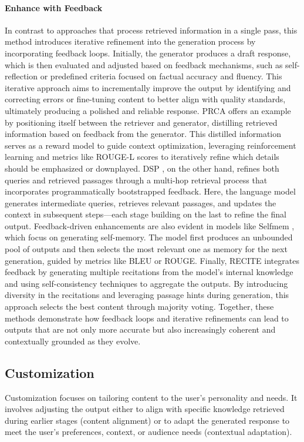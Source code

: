 \paragraph{Enhance with Feedback}
In contrast to approaches that process retrieved information in a single pass, this method introduces iterative refinement into the generation process by incorporating feedback loops. Initially, the generator produces a draft response, which is then evaluated and adjusted based on feedback mechanisms, such as self-reflection or predefined criteria focused on factual accuracy and fluency. This iterative approach aims to incrementally improve the output by identifying and correcting errors or fine-tuning content to better align with quality standards, ultimately producing a polished and reliable response. PRCA \cite{yang2023prca} offers an example by positioning itself between the retriever and generator, distilling retrieved information based on feedback from the generator. This distilled information serves as a reward model to guide context optimization, leveraging reinforcement learning and metrics like ROUGE-L scores to iteratively refine which details should be emphasized or downplayed. DSP \cite{khattab2022demonstratesearchpredict}, on the other hand, refines both queries and retrieved passages through a multi-hop retrieval process that incorporates programmatically bootstrapped feedback. Here, the language model generates intermediate queries, retrieves relevant passages, and updates the context in subsequent steps—each stage building on the last to refine the final output. Feedback-driven enhancements are also evident in models like Selfmem \cite{cheng2023lift}, which focus on generating self-memory. The model first produces an unbounded pool of outputs and then selects the most relevant one as memory for the next generation, guided by metrics like BLEU or ROUGE. Finally, RECITE \cite{shi2023replug} integrates feedback by generating multiple recitations from the model’s internal knowledge and using self-consistency techniques to aggregate the outputs. By introducing diversity in the recitations and leveraging passage hints during generation, this approach selects the best content through majority voting. Together, these methods demonstrate how feedback loops and iterative refinements can lead to outputs that are not only more accurate but also increasingly coherent and contextually grounded as they evolve.

\subsection{Customization}
Customization focuses on tailoring content to the user's personality and needs. It involves adjusting the output either to align with specific knowledge retrieved during earlier stages (content alignment) or to adapt the generated response to meet the user’s preferences, context, or audience needs (contextual adaptation).

